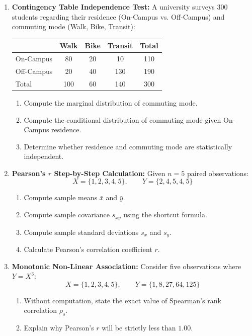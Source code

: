\begin{enumerate}
    \item \textbf{Contingency Table Independence Test:} A university surveys 300 students regarding their residence (On-Campus vs. Off-Campus) and commuting mode (Walk, Bike, Transit):
    \begin{center}
    \begin{tabular}{l|ccc|c}
    & Walk & Bike & Transit & Total \\
    \hline
    On-Campus & 80 & 20 & 10 & 110 \\
    Off-Campus & 20 & 40 & 130 & 190 \\
    \hline
    Total & 100 & 60 & 140 & 300 \\
    \end{tabular}
    \end{center}
    \begin{enumerate}
        \item Compute the marginal distribution of commuting mode.
        \item Compute the conditional distribution of commuting mode given On-Campus residence.
        \item Determine whether residence and commuting mode are statistically independent.
    \end{enumerate}

    \item \textbf{Pearson's $r$ Step-by-Step Calculation:} Given $n = 5$ paired observations:
    $$X = \{1, 2, 3, 4, 5\}, \qquad Y = \{2, 4, 5, 4, 5\}$$
    \begin{enumerate}
        \item Compute sample means $\bar{x}$ and $\bar{y}$.
        \item Compute sample covariance $s_{xy}$ using the shortcut formula.
        \item Compute sample standard deviations $s_x$ and $s_y$.
        \item Calculate Pearson's correlation coefficient $r$.
    \end{enumerate}

    \item \textbf{Monotonic Non-Linear Association:} Consider five observations where $Y = X^3$:
    $$X = \{1, 2, 3, 4, 5\}, \qquad Y = \{1, 8, 27, 64, 125\}$$
    \begin{enumerate}
        \item Without computation, state the exact value of Spearman's rank correlation $\rho_s$.
        \item Explain why Pearson's $r$ will be strictly less than $1.00$.
    \end{enumerate}


\end{enumerate}
